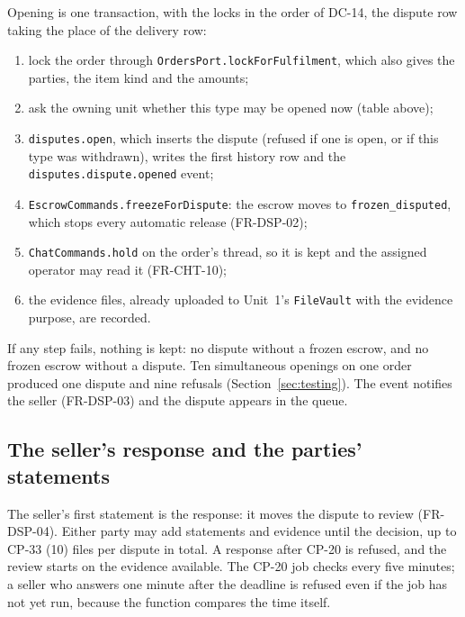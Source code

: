 \documentclass[11pt,a4paper]{article}
\begin{document}
Opening is one transaction, with the locks in the order of DC-14, the dispute row taking the place of the delivery row:
\begin{enumerate}[nosep]
  \item lock the order through \texttt{OrdersPort.lockForFulfilment}, which also gives the parties, the item kind and the amounts;
  \item ask the owning unit whether this type may be opened now (table above);
  \item \texttt{disputes.open}, which inserts the dispute (refused if one is open, or if this type was withdrawn), writes the first history row and the \texttt{disputes.dispute.opened} event;
  \item \texttt{EscrowCommands.freezeForDispute}: the escrow moves to \texttt{frozen\_disputed}, which stops every automatic release (FR-DSP-02);
  \item \texttt{ChatCommands.hold} on the order's thread, so it is kept and the assigned operator may read it (FR-CHT-10);
  \item the evidence files, already uploaded to Unit~1's \texttt{FileVault} with the evidence purpose, are recorded.
\end{enumerate}
If any step fails, nothing is kept: no dispute without a frozen escrow, and no frozen escrow without a dispute. Ten simultaneous openings on one order produced one dispute and nine refusals (Section~\ref{sec:testing}). The event notifies the seller (FR-DSP-03) and the dispute appears in the queue.

\subsection{The seller's response and the parties' statements}
The seller's first statement is the response: it moves the dispute to review (FR-DSP-04). Either party may add statements and evidence until the decision, up to CP-33 (10) files per dispute in total. A response after CP-20 is refused, and the review starts on the evidence available. The CP-20 job checks every five minutes; a seller who answers one minute after the deadline is refused even if the job has not yet run, because the function compares the time itself.
\end{document}
